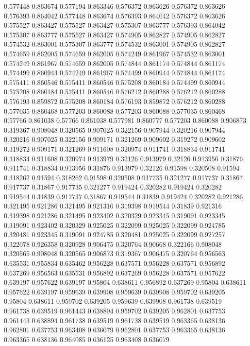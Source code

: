 0.577448 0.863674
0.577194 0.863346
0.576372 0.863626
0.576372 0.863626
0.576393 0.864042
0.577448 0.863674
0.576393 0.864042
0.576372 0.863626
0.575527 0.863427
0.575527 0.863427
0.575307 0.863777
0.576393 0.864042
0.575307 0.863777
0.575527 0.863427
0.574905 0.862827
0.574905 0.862827
0.574532 0.863001
0.575307 0.863777
0.574532 0.863001
0.574905 0.862827
0.574659 0.862005
0.574659 0.862005
0.574249 0.861967
0.574532 0.863001
0.574249 0.861967
0.574659 0.862005
0.574844 0.861174
0.574844 0.861174
0.574499 0.860944
0.574249 0.861967
0.574499 0.860944
0.574844 0.861174
0.575411 0.860546
0.575411 0.860546
0.575208 0.860184
0.574499 0.860944
0.575208 0.860184
0.575411 0.860546
0.576212 0.860288
0.576212 0.860288
0.576193 0.859872
0.575208 0.860184
0.576193 0.859872
0.576212 0.860288
0.577035 0.860468
0.577203 0.860088
0.577203 0.860088
0.577035 0.860468
0.57766 0.861038
0.57766 0.861038
0.577981 0.860777
0.577203 0.860088
0.906873 0.319367
0.908048 0.320565
0.907025 0.322156
0.907944 0.320216
0.907944 0.320216
0.907025 0.322156
0.909171 0.321269
0.909602 0.319272
0.909602 0.319272
0.909171 0.321269
0.911608 0.320974
0.911741 0.318834
0.911741 0.318834
0.911608 0.320974
0.913979 0.32126
0.913979 0.32126
0.913956 0.31876
0.911741 0.318834
0.913956 0.31876
0.913979 0.32126
0.91598 0.320508
0.91594 0.318262
0.91594 0.318262
0.91598 0.320508
0.917735 0.321277
0.917737 0.31867
0.917737 0.31867
0.917735 0.321277
0.919424 0.320282
0.919424 0.320282
0.919544 0.31839
0.917737 0.31867
0.919544 0.31839
0.919424 0.320282
0.921286 0.321495
0.921286 0.321495
0.921316 0.319398
0.919544 0.31839
0.921316 0.319398
0.921286 0.321495
0.923402 0.320329
0.923345 0.319091
0.923345 0.319091
0.923402 0.320329
0.925025 0.322099
0.925025 0.322099
0.924785 0.320481
0.923345 0.319091
0.924785 0.320481
0.925025 0.322099
0.927257 0.322078
0.926358 0.320928
0.906475 0.320764
0.90668 0.322166
0.908048 0.320565
0.908048 0.320565
0.906873 0.319367
0.906475 0.320764
0.956563 0.635531
0.955834 0.635462
0.956228 0.637571
0.956228 0.637571
0.956892 0.637269
0.956563 0.635531
0.956892 0.637269
0.956228 0.637571
0.957622 0.639197
0.957622 0.639197
0.95804 0.638611
0.956892 0.637269
0.95804 0.638611
0.957622 0.639197
0.959639 0.639908
0.959639 0.639908
0.959702 0.639205
0.95804 0.638611
0.959702 0.639205
0.959639 0.639908
0.961738 0.639519
0.961738 0.639519
0.961443 0.638894
0.959702 0.639205
0.962801 0.637753
0.961443 0.638894
0.961738 0.639519
0.961738 0.639519
0.963365 0.638136
0.962801 0.637753
0.963408 0.636079
0.962801 0.637753
0.963365 0.638136
0.963365 0.638136
0.964085 0.636125
0.963408 0.636079
